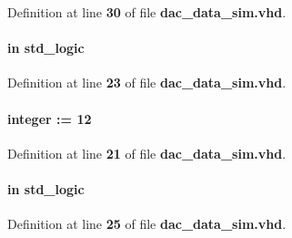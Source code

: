 Definition at line {\bf 30} of file {\bf dac\+\_\+data\+\_\+sim.\+vhd}.

\paragraph[{clk}]{ {\bfseries \textcolor{keywordflow}{in}\textcolor{vhdlchar}{ }} {\bfseries \textcolor{comment}{std\+\_\+logic}\textcolor{vhdlchar}{ }} \hspace{0.3cm}{\ttfamily [Port]}}\label{classdac__data__sim_a4a4609c199d30b3adebbeb3a01276ec5}


Definition at line {\bf 23} of file {\bf dac\+\_\+data\+\_\+sim.\+vhd}.

\paragraph[{data\+\_\+width}]{ {\bfseries \textcolor{vhdlchar}{ }} {\bfseries \textcolor{comment}{integer}\textcolor{vhdlchar}{ }\textcolor{vhdlchar}{ }\textcolor{vhdlchar}{\+:}\textcolor{vhdlchar}{=}\textcolor{vhdlchar}{ }\textcolor{vhdlchar}{ } \textcolor{vhdldigit}{12} \textcolor{vhdlchar}{ }} \hspace{0.3cm}{\ttfamily [Generic]}}\label{classdac__data__sim_a767062193f3a56a69d58d31e9a52f103}


Definition at line {\bf 21} of file {\bf dac\+\_\+data\+\_\+sim.\+vhd}.

\paragraph[{en}]{ {\bfseries \textcolor{keywordflow}{in}\textcolor{vhdlchar}{ }} {\bfseries \textcolor{comment}{std\+\_\+logic}\textcolor{vhdlchar}{ }} \hspace{0.3cm}{\ttfamily [Port]}}\label{classdac__data__sim_adcf9c6f5161d039addbda5819bee64a3}


Definition at line {\bf 25} of file {\bf dac\+\_\+data\+\_\+sim.\+vhd}.

